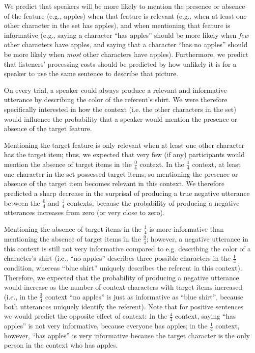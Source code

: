 \documentclass[man, noapacite]{apa2}
\begin{document}
We predict that speakers will be more likely to mention the presence or absence of the feature (e.g., apples) when that feature is relevant (e.g., when at least one other character in the set has apples), and when mentioning that feature is informative (e.g., saying a character ``has apples'' should be more likely when \emph{few} other characters have apples, and saying that a character ``has no apples'' should be more likely when \emph{most} other characters have apples). Furthermore, we predict that listeners' processing costs should be predicted by how unlikely it is for a speaker to use the same sentence to describe that picture.

On every trial, a speaker could always produce a relevant and informative utterance by describing the color of the referent's shirt. We were therefore specifically interested in how the context (i.e. the other characters in the set) would influence the probability that a speaker would mention the presence or absence of the target feature.

Mentioning the target feature is only relevant when at least one other character has the target item; thus, we expected that very few (if any) participants would mention the absence of target items in the $\frac{0}{4}$ context. In the $\frac{1}{4}$ context, at least one character in the set possessed target items, so mentioning the presence or absence of the target item becomes relevant in this context. We therefore predicted a sharp decrease in the surprisal of producing a true negative utterance between the $\frac{0}{4}$ and $\frac{1}{4}$ contexts, because the probability of producing a negative utterances increases from zero (or very close to zero).

Mentioning the absence of target items in the $\frac{1}{4}$ is more informative than mentioning the absence of target items in the $\frac{0}{4}$; however, a negative utterance in this context is still not very informative compared to e.g. describing the color of a character's shirt (i.e., ``no apples'' describes three possible characters in the $\frac{1}{4}$ condition, whereas ``blue shirt'' uniquely describes the referent in this context). Therefore, we expected that the probability of producing a negative utterance would increase as the number of context characters with target items increased (i.e., in the $\frac{3}{4}$ context ``no apples'' is just as informative as ``blue shirt'', because both utterances uniquely identify the referent). Note that for positive sentences we would predict the opposite effect of context: In the $\frac{4}{4}$ context, saying ``has apples'' is not very informative, because everyone has apples; in the $\frac{1}{4}$ context, however, ``has apples'' is very informative because the target character is the only person in the context who has apples.
\end{document}
